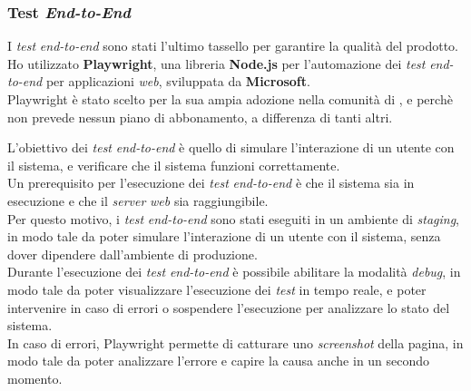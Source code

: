 \subsubsection*{Test \textit{End-to-End}}
I \textit{test} \textit{end-to-end} sono stati l'ultimo tassello per garantire la qualità del prodotto.
Ho utilizzato \textbf{Playwright}, una libreria \textbf{Node.js} per l'automazione dei \textit{test} \textit{end-to-end}
 per applicazioni \textit{web}, sviluppata da \textbf{Microsoft}.\\
Playwright è stato scelto per la sua ampia adozione nella comunità di \azienda{},
e perchè non prevede nessun piano di abbonamento, a differenza di tanti altri.

L'obiettivo dei \textit{test} \textit{end-to-end} è quello di simulare l'interazione di 
un utente con il sistema, e verificare che il sistema funzioni correttamente.\\
Un prerequisito per l'esecuzione dei \textit{test} \textit{end-to-end} è che il sistema sia in esecuzione
e che il \textit{server} \textit{web} sia raggiungibile.\\
Per questo motivo, i \textit{test} \textit{end-to-end} sono stati eseguiti in un ambiente di \textit{staging},
in modo tale da poter simulare l'interazione di un utente con il sistema, senza dover dipendere
dall'ambiente di produzione.\\

Durante l'esecuzione dei \textit{test} \textit{end-to-end} è possibile abilitare la modalità \textit{debug},
in modo tale da poter visualizzare l'esecuzione dei \textit{test} in tempo reale, e poter intervenire
in caso di errori o sospendere l'esecuzione per analizzare lo stato del sistema.\\

In caso di errori, Playwright permette di catturare uno \textit{screenshot} della pagina,
in modo tale da poter analizzare l'errore e capire la causa anche in un secondo momento.\\


